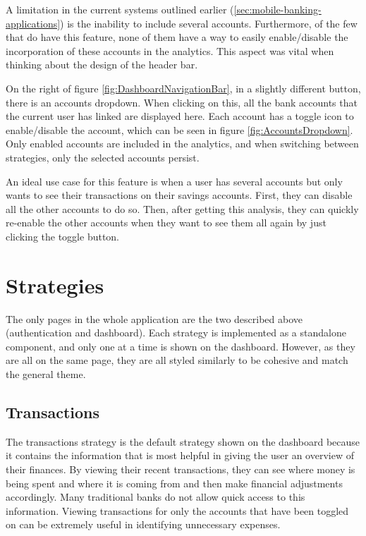 A limitation in the current systems outlined earlier (\ref{sec:mobile-banking-applications}) is the inability to include several accounts. Furthermore, of the few that do have this feature, none of them have a way to easily enable/disable the incorporation of these accounts in the analytics. This aspect was vital when thinking about the design of the header bar.

On the right of figure \ref{fig:DashboardNavigationBar}, in a slightly different button, there is an accounts dropdown. When clicking on this, all the bank accounts that the current user has linked are displayed here. Each account has a toggle icon to enable/disable the account, which can be seen in figure \ref{fig:AccountsDropdown}. Only enabled accounts are included in the analytics, and when switching between strategies, only the selected accounts persist.

An ideal use case for this feature is when a user has several accounts but only wants to see their transactions on their savings accounts. First, they can disable all the other accounts to do so. Then, after getting this analysis, they can quickly re-enable the other accounts when they want to see them all again by just clicking the toggle button.

\section{Strategies}
The only pages in the whole application are the two described above (authentication and dashboard). Each strategy is implemented as a standalone component, and only one at a time is shown on the dashboard. However, as they are all on the same page, they are all styled similarly to be cohesive and match the general theme.

\subsection{Transactions}
The transactions strategy is the default strategy shown on the dashboard because it contains the information that is most helpful in giving the user an overview of their finances. By viewing their recent transactions, they can see where money is being spent and where it is coming from and then make financial adjustments accordingly. Many traditional banks do not allow quick access to this information. Viewing transactions for only the accounts that have been toggled on can be extremely useful in identifying unnecessary expenses.

